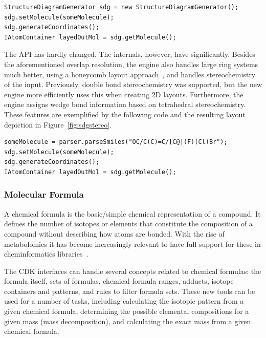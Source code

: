 \documentclass[10pt]{bmcart}
\begin{document}
\begin{verbatim}
StructureDiagramGenerator sdg = new StructureDiagramGenerator();
sdg.setMolecule(someMolecule);
sdg.generateCoordinates();
IAtomContainer layedOutMol = sdg.getMolecule();
\end{verbatim}

The API has hardly changed. The internals, however, have significantly. Besides
the aforementioned overlap resolution, the engine also handles large ring
systems much better, using a honeycomb layout approach~\cite{FIXME}, %
and handles stereochemistry of the input. Previously, double bond stereochemistry
was supported, but the new engine more efficiently uses this when creating 2D
layouts. Furthermore, the engine assigns wedge bond information based on
tetrahedral stereochemistry. These features are exemplified by the following
code and the resulting layout depiction in Figure~\ref{fig:sdgstereo}.

\begin{verbatim}
someMolecule = parser.parseSmiles("OC/C(C)=C/[C@](F)(Cl)Br");
sdg.setMolecule(someMolecule);
sdg.generateCoordinates();
IAtomContainer layedOutMol = sdg.getMolecule();
\end{verbatim}


  \subsubsection*{Molecular Formula}

  A chemical formula is the basic/simple chemical representation of a compound.
It defines the number of isotopes or elements that constitute the composition
of a compound without describing how atoms are bonded. With the rise of
metabolomics it has become increasingly relevant to have full support for these
in cheminformatics libraries~\cite{RojasCherto2011}.

  The CDK interfaces can handle several concepts related to chemical formulas:
the formula itself, sets of formulas, chemical formula ranges, adducts, isotope
containers and patterns, and rules to filter formula sets. These new tools can
be used for a number of tasks, including calculating the isotopic pattern from
a given chemical formula, determining the possible elemental compositions for a
given mass (mass decomposition), and calculating the exact mass from a given
chemical formula.
\end{document}
